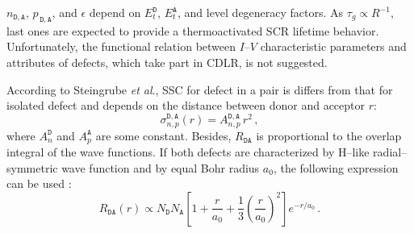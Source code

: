 \documentclass[aip,jap, amsmath,amssymb,reprint]{revtex4-1}
\begin{document}
$n_{\mathtt{D,A}}$, $p_{\,\mathtt{D,A}}$, and $\epsilon$ depend on $E_t^{\mathtt{D}}$, $E_t^{\mathtt{A}}$, and level degeneracy  factors.
As $\tau_g\propto R^{-1}$, last ones are expected to provide a thermoactivated SCR lifetime behavior.
Unfortunately, the functional relation between $I$--$V$ characteristic parameters and attributes of defects, which take part in CDLR, is not suggested.

According to Steingrube \emph{et al}.\cite{CDLR:JAP},
SSC for defect in a pair is differs from that for isolated defect and depends on the distance between donor and acceptor $r$:
\begin{equation}
\label{eqSigma}
\sigma_{n,p}^{\mathtt{D,A}}(r)=A_{n,p}^{\mathtt{D,A}}\,r^2\,,
\end{equation}
where $A_{n}^{\mathtt{D}}$ and $A_{p}^{\mathtt{A}}$ are some constant.
Besides, $R_{\mathtt{DA}}$ is proportional to the overlap integral of the wave functions.
If both defects are characterized by H--like radial--symmetric wave function and by equal Bohr radius $a_0$,
the following expression can be used \cite{CDLR:JAP}:
\begin{equation}
\label{eqRda}
R_{\mathtt{DA}} (r) \propto N_{\mathtt{D}}N_{\mathtt{A}}\left[1+\frac{r}{a_0}+\frac{1}{3}\left(\frac{r}{a_0}\right)^2\right]
   e^{-r/a_0}\,.
\end{equation}


\end{document}
